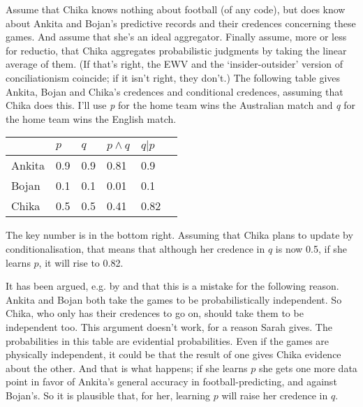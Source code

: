Assume that \gls{Chika} knows nothing about football (of any code), but does know about \gls{Ankita} and \gls{Bojan}'s predictive records and their credences concerning these games. And assume that she's an ideal aggregator. Finally assume, more or less for reductio, that \gls{Chika} aggregates probabilistic judgments by taking the linear average of them. (If that's right, the EWV and the `insider-outsider' version of conciliationism coincide; if it isn't right, they don't.) The following table gives \gls{Ankita}, \gls{Bojan} and \gls{Chika}'s credences and conditional credences, assuming that \gls{Chika} does this. I'll use \emph{p} for the home team wins the Australian match and \emph{q} for the home team wins the English match.

\begin{table}[htbp]
\begin{minipage}{\linewidth}
\setlength{\tymax}{0.5\linewidth}
\centering
\small
\begin{tabulary}{\textwidth}{@{}llllll@{}} \toprule
 & $p$ & $q$ & $p \wedge q$ & $q \vert p$ \\
\midrule

 \gls{Ankita} & 0.9 & 0.9 & 0.81 & 0.9 \\
 \gls{Bojan} & 0.1 & 0.1 & 0.01 & 0.1 \\
 \gls{Chika} & 0.5 & 0.5 & 0.41 & 0.82 \\
\bottomrule

\end{tabulary}
\end{minipage}
\end{table}

\noindent The key number is in the bottom right. Assuming that \gls{Chika} plans to update by conditionalisation, that means that although her credence in $q$ is now 0.5, if she learns $p$, it will rise to 0.82.

It has been argued, e.g. by \citet{Loewer1985} and \citet{JehleFitelson2009} that this is a mistake for the following reason. \gls{Ankita} and \gls{Bojan} both take the games to be probabilistically independent. So \gls{Chika}, who only has their credences to go on, should take them to be independent too. This argument doesn't work, for a reason Sarah \citet{Moss2011} gives. The probabilities in this table are evidential probabilities. Even if the games are physically independent, it could be that the result of one gives \gls{Chika} evidence about the other. And that is what happens; if she learns $p$ she gets one more data point in favor of \gls{Ankita}'s general accuracy in football-predicting, and against \gls{Bojan}'s. So it is plausible that, for her, learning $p$ will raise her credence in $q$.

